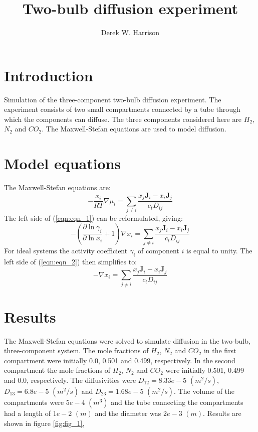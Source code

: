 \documentclass[11]{report}
\begin{document}
\author{Derek W. Harrison}
\title{Two-bulb diffusion experiment}
\maketitle

\section*{Introduction}
Simulation of the three-component two-bulb diffusion experiment. The experiment consists of two small compartments connected by a tube through which the components can diffuse. The three components considered here are $H_2$, $N_2$ and $CO_2$. The Maxwell-Stefan equations are used to model diffusion. 

\section*{Model equations}
The Maxwell-Stefan equations are:
\begin{equation}
\label{eqn:eqn_1}
-\frac{x_i}{RT} \nabla \mu_i = \sum_{j \neq i} \frac{x_j \textbf{J}_i - x_i \textbf{J}_j}{c_t D_{ij}}
\end{equation}
The left side of (\ref{eqn:eqn_1}) can be reformulated, giving:
\begin{equation}
\label{eqn:eqn_2}
-\left( \frac{\partial \ln{\gamma_i}}{\partial \ln{x_i}} + 1 \right) \nabla x_i = \sum_{j \neq i} \frac{x_j \textbf{J}_i - x_i \textbf{J}_j}{c_t D_{ij}}
\end{equation}
For ideal systems the activity coefficient $\gamma_i$ of component $i$ is equal to unity. The left side of (\ref{eqn:eqn_2}) then simplifies to:
\begin{equation}
\label{eqn:eqn_3}
- \nabla x_i = \sum_{j \neq i} \frac{x_j \textbf{J}_i - x_i \textbf{J}_j}{c_t D_{ij}}
\end{equation}

\section*{Results}
The Maxwell-Stefan equations were solved to simulate diffusion in the two-bulb, three-component system. The mole fractions of $H_2$, $N_2$ and $CO_2$ in the first compartment were initially 0.0, 0.501 and 0.499, respectively. In the second compartment the mole fractions of $H_2$, $N_2$ and $CO_2$ were initially 0.501, 0.499 and 0.0, respectively. The diffusivities were $D_{12} = 8.33e-5$  $(m^2/s)$, $D_{13} = 6.8e-5$ $(m^2/s)$ and $D_{23} = 1.68e-5$ $(m^2/s)$. The volume of the compartments were $5e-4$ $(m^3)$ and the tube connecting the compartments had a length of $1e-2$ $(m)$ and the diameter was $2e-3$ $(m)$. Results are shown in figure \ref{fig:fig_1}, 
\end{document}
